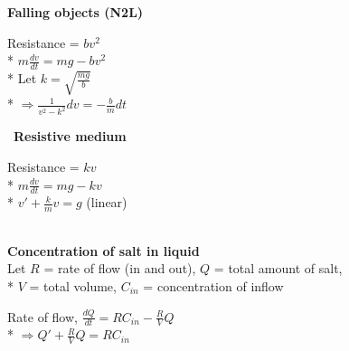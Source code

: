 \documentclass[10pt, landscape]{article}
\newenvironment{tightcenter}{%
  \setlength\topsep{0pt}
  \setlength\parskip{0pt}
  \begin{center}
}{%
  \end{center}
}
\let\Then\Rightarrow
\begin{document}
\begin{multicols*}{4}
\begin{multicols}{2}
    \textbf{Falling objects (N2L)}
    \begin{tightcenter}
        Resistance = $bv^2$
        \\* $m \frac{dv}{dt} = mg - bv^2$
        \\* Let $k = \sqrt{\frac{mg}{b}}$ 
        \\* $\Then \frac{1}{v^2 - k^2} dv = -\frac{b}{m}dt$
    \end{tightcenter}

    \ \textbf{Resistive medium}
    \begin{tightcenter}
        Resistance = $kv$
        \\* $m \frac{dv}{dt} = mg - kv$
        \\* $v' + \frac{k}{m}v = g$ (linear)
        \\ \ 
    \end{tightcenter}
\end{multicols}

\textbf{Concentration of salt in liquid}
\\ Let $R$ = rate of flow (in and out), $Q$ = total amount of salt, 
    \\* $V$ = total volume, $C_{in}$ = concentration of inflow
\begin{tightcenter}
    Rate of flow, $\frac{dQ}{dt} = RC_{in} - \frac{R}{V}Q$
    \\* $\Then Q' + \frac{R}{V}Q = RC_{in}$
\end{tightcenter}

\end{multicols*}
\end{document}
